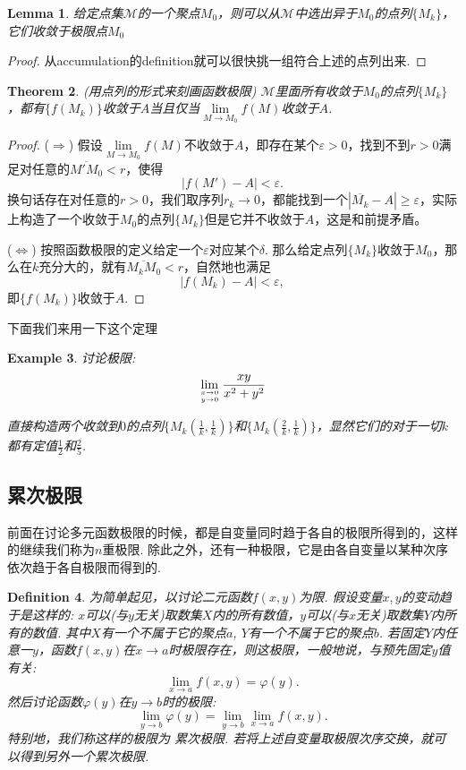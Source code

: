 \documentclass{article}
\newtheorem{theorem}{Theorem}[section]
\newtheorem{lemma}[theorem]{Lemma}
\newtheorem{example}[theorem]{Example}
\newtheorem{definition}[theorem]{Definition}
\begin{document}
\begin{lemma}
\rm 给定点集$\mathcal{M}$的一个聚点$M_0$，则可以从$\mathcal{M}$中选出异于$M_0$的点列$\{M_k\}$，它们收敛于极限点$M_0$
\end{lemma}

\begin{proof}
从accumulation的definition就可以很快挑一组符合上述的点列出来.
\end{proof}


\begin{theorem}
\rm {\color{red} (用点列的形式来刻画函数极限)} $\mathcal{M}$里面所有收敛于$M_0$的点列$\{M_k\}$，都有$\{f(M_k)\}$收敛于$A$当且仅当$\lim\limits_{M\rightarrow M_0}f(M)$收敛于$A$.
\end{theorem}

\begin{proof}
($\Rightarrow$) 假设$\lim\limits_{M\rightarrow M_0}f(M)$不收敛于$A$，即存在某个$\varepsilon > 0$，找到不到$r > 0$满足对任意的$\overline{M'M_0} < r$，使得
$$
|f(M') - A| < \varepsilon.
$$
换句话存在对任意的$r > 0$，我们取序列$r_k \rightarrow 0$，都能找到一个$|\overline{M_k}-A| \geq \varepsilon$，实际上构造了一个收敛于$M_0$的点列$\{M_k\}$但是它并不收敛于$A$，这是和前提矛盾。

($\Leftrightarrow$) 按照函数极限的定义给定一个$\varepsilon$对应某个$\delta$. 那么给定点列$\{M_k\}$收敛于$M_0$，那么在$k$充分大的，就有$\overline{M_kM_0} < r$，自然地也满足
$$
|f(M_k) - A| < \varepsilon,
$$
即$\{f(M_k)\}$收敛于$A$.
\end{proof}

{\color{blue} 下面我们来用一下这个定理}

\begin{example}
\rm 讨论极限:
$$
\lim\limits_{x \rightarrow 0 \atop y \rightarrow 0 } \frac{xy}{x^2+y^2}
$$

直接构造两个收敛到$0$的点列$\{M_k(\frac{1}{k}, \frac{1}{k})\}$和$\{M_k(\frac{2}{k}, \frac{1}{k})\}$，显然它们的对于一切$k$都有定值$\frac{1}{2}$和$\frac{2}{5}$.
\end{example}

\subsection{累次极限}

前面在讨论多元函数极限的时候，都是自变量同时趋于各自的极限所得到的，这样的继续我们称为{\color{red}$n$重极限}. 除此之外，还有一种极限，它是由各自变量以某种次序依次趋于各自极限而得到的.

\begin{definition}
\rm 为简单起见，以讨论二元函数$f(x,y)$为限. 假设变量$x,y$的变动趋于是这样的: $x$可以(与$y$无关)取数集$X$内的所有数值，$y$可以(与$x$无关)取数集$Y$内所有的数值. 其中$X$有一个不属于它的聚点$a$, $Y$有一个不属于它的聚点$b$. 若固定$Y$内任意一$y$，函数$f(x,y)$在$x \rightarrow a$时极限存在，则这极限，一般地说，与预先固定$y$值有关:
$$
\lim\limits_{x \rightarrow a} f(x,y) = \varphi(y).
$$
然后讨论函数$\varphi(y)$在$y \rightarrow b$时的极限:
$$
\lim\limits_{y \rightarrow b} \varphi(y) = \lim\limits_{y \rightarrow b}\lim\limits_{x \rightarrow a} f(x,y).
$$
特别地，我们称这样的极限为{\color{red} 累次极限}. 若将上述自变量取极限次序交换，就可以得到另外一个累次极限.
\end{definition}
\end{document}
